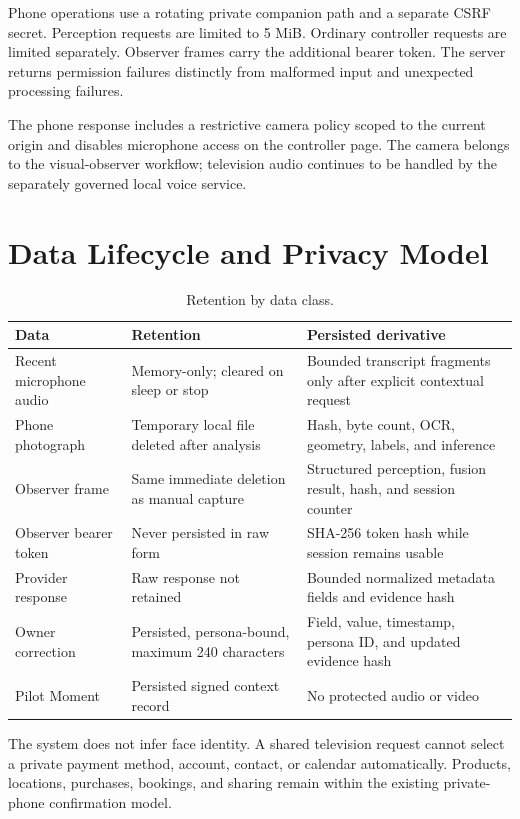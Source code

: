 \documentclass[11pt,a4paper]{article}
\begin{document}
Phone operations use a rotating private companion path and a separate CSRF
secret.  Perception requests are limited to 5 MiB.  Ordinary controller
requests are limited separately.  Observer frames carry the additional bearer
token.  The server returns permission failures distinctly from malformed input
and unexpected processing failures.

The phone response includes a restrictive camera policy scoped to the current
origin and disables microphone access on the controller page.  The camera
belongs to the visual-observer workflow; television audio continues to be
handled by the separately governed local voice service.

\section{Data Lifecycle and Privacy Model}

\begin{table}[htbp]
\centering
\small
\caption{Retention by data class.}
\begin{tabularx}{\textwidth}{@{}L{35mm}L{35mm}Y@{}}
\toprule
Data & Retention & Persisted derivative\\
\midrule
Recent microphone audio & Memory-only; cleared on sleep or stop & Bounded
transcript fragments only after explicit contextual request\\
Phone photograph & Temporary local file deleted after analysis & Hash, byte
count, OCR, geometry, labels, and inference\\
Observer frame & Same immediate deletion as manual capture & Structured
perception, fusion result, hash, and session counter\\
Observer bearer token & Never persisted in raw form & SHA-256 token hash while
session remains usable\\
Provider response & Raw response not retained & Bounded normalized metadata
fields and evidence hash\\
Owner correction & Persisted, persona-bound, maximum 240 characters & Field,
value, timestamp, persona ID, and updated evidence hash\\
Pilot Moment & Persisted signed context record & No protected audio or video\\
\bottomrule
\end{tabularx}
\end{table}

The system does not infer face identity.  A shared television request cannot
select a private payment method, account, contact, or calendar automatically.
Products, locations, purchases, bookings, and sharing remain within the
existing private-phone confirmation model.
\end{document}
